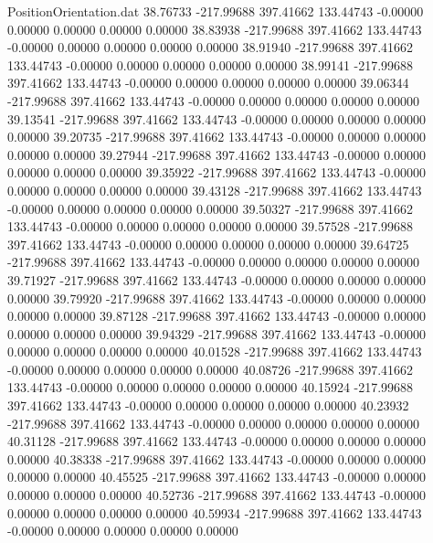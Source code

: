 \begin{filecontents}{PositionOrientation.dat}
  38.76733 -217.99688  397.41662   133.44743   -0.00000    0.00000    0.00000    0.00000    0.00000
  38.83938 -217.99688  397.41662   133.44743   -0.00000    0.00000    0.00000    0.00000    0.00000
  38.91940 -217.99688  397.41662   133.44743   -0.00000    0.00000    0.00000    0.00000    0.00000
  38.99141 -217.99688  397.41662   133.44743   -0.00000    0.00000    0.00000    0.00000    0.00000
  39.06344 -217.99688  397.41662   133.44743   -0.00000    0.00000    0.00000    0.00000    0.00000
  39.13541 -217.99688  397.41662   133.44743   -0.00000    0.00000    0.00000    0.00000    0.00000
  39.20735 -217.99688  397.41662   133.44743   -0.00000    0.00000    0.00000    0.00000    0.00000
  39.27944 -217.99688  397.41662   133.44743   -0.00000    0.00000    0.00000    0.00000    0.00000
  39.35922 -217.99688  397.41662   133.44743   -0.00000    0.00000    0.00000    0.00000    0.00000
  39.43128 -217.99688  397.41662   133.44743   -0.00000    0.00000    0.00000    0.00000    0.00000
  39.50327 -217.99688  397.41662   133.44743   -0.00000    0.00000    0.00000    0.00000    0.00000
  39.57528 -217.99688  397.41662   133.44743   -0.00000    0.00000    0.00000    0.00000    0.00000
  39.64725 -217.99688  397.41662   133.44743   -0.00000    0.00000    0.00000    0.00000    0.00000
  39.71927 -217.99688  397.41662   133.44743   -0.00000    0.00000    0.00000    0.00000    0.00000
  39.79920 -217.99688  397.41662   133.44743   -0.00000    0.00000    0.00000    0.00000    0.00000
  39.87128 -217.99688  397.41662   133.44743   -0.00000    0.00000    0.00000    0.00000    0.00000
  39.94329 -217.99688  397.41662   133.44743   -0.00000    0.00000    0.00000    0.00000    0.00000
  40.01528 -217.99688  397.41662   133.44743   -0.00000    0.00000    0.00000    0.00000    0.00000
  40.08726 -217.99688  397.41662   133.44743   -0.00000    0.00000    0.00000    0.00000    0.00000
  40.15924 -217.99688  397.41662   133.44743   -0.00000    0.00000    0.00000    0.00000    0.00000
  40.23932 -217.99688  397.41662   133.44743   -0.00000    0.00000    0.00000    0.00000    0.00000
  40.31128 -217.99688  397.41662   133.44743   -0.00000    0.00000    0.00000    0.00000    0.00000
  40.38338 -217.99688  397.41662   133.44743   -0.00000    0.00000    0.00000    0.00000    0.00000
  40.45525 -217.99688  397.41662   133.44743   -0.00000    0.00000    0.00000    0.00000    0.00000
  40.52736 -217.99688  397.41662   133.44743   -0.00000    0.00000    0.00000    0.00000    0.00000
  40.59934 -217.99688  397.41662   133.44743   -0.00000    0.00000    0.00000    0.00000    0.00000

\end{filecontents}
